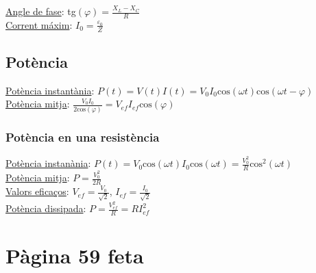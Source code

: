 \documentclass[12pt]{article}
\begin{document}
\begin{multicols}{2}
\underline{Angle de fase}: tg$(\varphi)=\frac{X_L-X_C}{R}$ \\
\underline{Corrent máxim}: $I_0 = \frac{\varepsilon_0}{Z}$

\subsection*{Potència}

\underline{Potència instantània}: $P(t) = V(t)I(t) = V_0I_0\text{cos}(\omega t)\text{cos}(\omega t - \varphi)$ \\
\underline{Potència mitja}: $\frac{V_0I_0}{2\text{cos}(\varphi)} = V_{ef}I_{ef}\text{cos}(\varphi)$

\subsubsection*{Potència en una resistència}

\underline{Potència instanània}: $P(t) = V_0\text{cos}(\omega t)I_0\text{cos}(\omega t) = \frac{V_0^2}{R}\text{cos}^2(\omega t)$ \\
\underline{Potència mitja}: $P = \frac{V_0^2}{2R}$ \\
\underline{Valors eficaços}: $V_{ef} = \frac{V_0}{\sqrt{2}}$, $I_{ef} = \frac{I_0}{\sqrt{2}}$ \\
\underline{Potència dissipada}: $P = \frac{V_{ef}^2}{R} = RI_{ef}^2$

\section*{Pàgina 59 feta}
\end{multicols}
\end{document}
